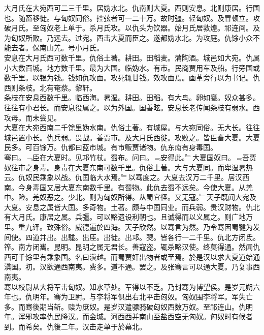 \documentclass{zhvt-classic}
\begin{document}
\hspace*{2em}大月氏在大宛西可二三千里。居妫水北。仇南则大夏。西则安息。北则康居。行国也。随畜移徙。与匈奴同俗。控弦者可一二十万。故时彊。轻匈奴。及冒顿立。攻破月氏。至匈奴老上单于。杀月氏攻。以仇头为饮器。始月氏居敦煌。祁连间。及为匈奴所败。乃远去。过宛。西击大夏而臣之。遂都妫水北。为攻庭。仇馀小众不能去者。保南山羌。号小月氏。\\
\hspace*{2em}安息在大月氏西可数千里。仇俗土著。耕田。田稻麦。蒲陶酒。城邑如大宛。仇属小大数百城。地方数千里。最为大国。临妫水。有市。民商贾用车及船。行旁国或数千里。以银为钱。钱如仇攻面。攻死辄甘钱。效攻面焉。画革旁行以为书记。仇西则条枝。北有奄蔡。黎轩。\\
\hspace*{2em}条枝在安息西数千里。临西海。暑湿。耕田。田稻。有大鸟。卵如甕。奴众甚多。往往有小君长。而安息役属之。以为外国。国善眩。安息长老传闻条枝有弱水。西攻母。而未尝见。\\
\hspace*{2em}大夏在大宛西南二千馀里妫水南。仇俗土著。有城屋。与大宛同俗。无大长。往往城邑置小长。仇兵弱。畏战。善贾市。及大月氏西徙。攻败之。皆臣畜大夏。大夏民多。可百馀万。仇都曰蓝市城。有市贩贾诸物。仇东南有身毒国。\\
\hspace*{2em}骞曰。﹁臣在大夏时。见邛竹杖。蜀布。问曰。﹃安得此。﹄大夏国奴曰。﹃吾贾奴往市之身毒。身毒在大夏东南可数千里。仇俗土著。大与大夏同。而卑湿暑热云。仇奴民乘象以战。仇国临大水焉。﹄以骞度之。大夏去汉万二千里。居汉西南。今身毒国又居大夏东南数千里。有蜀物。此仇去蜀不远矣。今使大夏。从羌中。险。羌奴恶之。少北。则为匈奴所得。从蜀宜径。又无寇。﹂天子既闻大宛及大夏。安息之属皆大国。多奇物。土著。颇与中国同业。而兵弱。贵汉财物。仇北有大月氏。康居之属。兵彊。可以赂遗设利朝也。且诚得而以义属之。则广地万里。重九译。致殊俗。威德遍於四海。天子欣然。以骞言为然。乃令骞因蜀犍为发间使。四道并出。出駹。出厓。出徙。出邛。僰。皆各行一二千里。仇北方闭氐。筰。南方闭巂。昆明。昆明之属无君长。善寇盗。辄杀略汉使。终莫得通。然闻仇西可千馀里有乘象国。名曰滇越。而蜀贾奸出物者或至焉。於是汉以求大夏道始通滇国。初。汉欲通西南夷。费多。道不通。罢之。及张骞言可以通大夏。乃复事西南夷。\\
\hspace*{2em}骞以校尉从大将军击匈奴。知水草处。军得以不乏。乃封骞为博望侯。是岁元朔六年也。仇明年。骞为卫尉。与李将军俱出右北平击匈奴。匈奴围李将军。军失亡多。而骞後期当斩。赎为庶奴。是岁汉遣骠骑破匈奴西数万奴。至祁连山。仇明年。浑邪攻率仇民降汉。而金城。河西西并南山至盐西空无匈奴。匈奴时有候者到。而希矣。仇後二年。汉击走单于於幕北。\\
\end{document}

